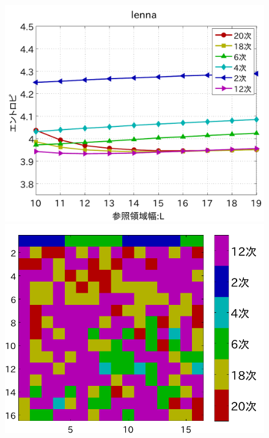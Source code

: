 \documentclass[25pt,landscape,dvipdfmx,uplatex]{foils}
\begin{document}
\begin{figure}[b]
\begin{flushleft}
\includegraphics[scale=0.75]{fig/test1/lenna.pdf}\\
\vspace{3mm}
\includegraphics[angle=-90,scale=0.75]{fig/test1/l32/yosokusikino.pdf}

\end{flushleft}
\end{figure}
\end{document}
